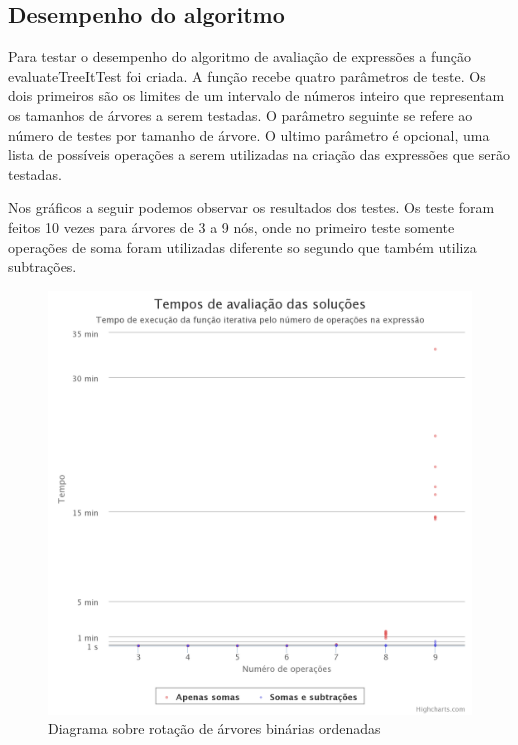 \subsection{Desempenho do algoritmo}
Para testar o desempenho do algoritmo de avaliação de expressões a função evaluateTreeItTest foi criada. A função recebe quatro parâmetros de teste. Os dois primeiros são os limites de um intervalo de números inteiro que representam os tamanhos de árvores a serem testadas. O parâmetro seguinte se refere ao número de testes por tamanho de árvore. O ultimo parâmetro é opcional, uma lista de possíveis operações a serem utilizadas na criação das expressões que serão testadas.

	Nos gráficos a seguir podemos observar os resultados dos testes. Os teste foram feitos 10 vezes para árvores de 3 a 9 nós, onde no primeiro teste somente operações de soma foram utilizadas diferente so segundo que também utiliza subtrações.
	
\begin{figure}[H]
	\caption{\label{gram_cls}Diagrama sobre rotação de árvores binárias ordenadas}
	\begin{center}
	    \includegraphics[scale=0.25]{timming_test_lin.png}
	\end{center}
\end{figure}


